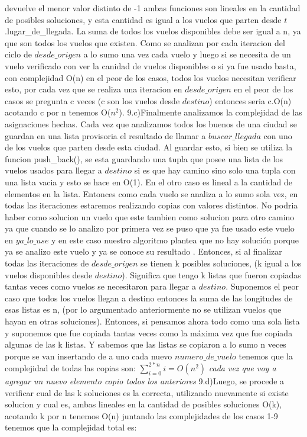 \documentclass[a4paper]{article}
\begin{document}
devuelve el menor valor distinto de -1 ambas funciones son lineales en la cantidad de posibles soluciones, y esta cantidad es igual a los vuelos que parten desde $t$.lugar\_de\_llegada. La suma de todos los vuelos disponibles debe ser igual a n, ya que son todos los vuelos que existen. Como se analizan por cada iteracion del ciclo de $desde\_origen$ a lo sumo una vez cada vuelo y luego si se necesita de un vuelo verificado con ver la canidad de vuelos disponibles o si ya fue usado basta, con complejidad O(n) en el peor de los casos, todos los vuelos necesitan verificar esto, por cada vez que se realiza una iteracion en  $desde\_origen$ en el peor de los casos se pregunta c veces (c son los vuelos desde $destino$) entonces seria c.O(n) acotando c por n tenemos O($n^{2}$). \newline
9.c)Finalmente analizamos la complejidad de las asignaciones hechas. Cada vez que analizamos todos los buenos de una ciudad se guardan en una lista provisoria el resultado de llamar a $buscar\_llegada$ con uno de los vuelos que parten desde esta ciudad. Al guardar esto, si bien se utiliza la funcion push\_back(), se esta guardando una tupla que posee una lista de los vuelos usados para llegar a $destino$ si es que hay camino sino solo una tupla con una lista vacia y esto se hace en O(1). En el otro caso es lineal a la cantidad de elementos en la lista. Entonces como cada vuelo se analiza a lo sumo sola vez, en todas las iteraciones estaremos realizando copias con valores distintos. No podria haber como solucion un vuelo que este tambien como solucion para otro camino ya que cuando se lo analizo por primera vez se puso que ya fue usado este vuelo en $ya\_lo\_use$ y en este caso nuestro algoritmo plantea que no hay solución porque ya se analizo este vuelo y ya se conoce su resultado . Entonces, si al finalizar todas las iteraciones de $desde\_origen$ se tienen k posibles soluciones, (k igual a los vuelos disponibles desde $destino$). Significa que tengo k listas que fueron copiadas tantas veces como vuelos se necesitaron para llegar a $destino$. Suponemos el peor caso que todos los vuelos llegan a destino entonces la suma de las longitudes de esas listas es n, (por lo argumentado anteriormente no se utilizan vuelos que hayan en otras soluciones). Entonces, si pensamos ahora todo como una sola lista y suponemos que fue copiada tantas veces como la máxima vez que fue copiada algunas de las k listas. Y sabemos que las listas se copiaron a lo sumo n veces porque se van insertando de a uno cada nuevo $numero\_de\_vuelo$ 
tenemos que la complejidad de todas las copias son:\newline
$\sum_{i=0}^{2*n}{i}= O(n^{2})$\newline
\textit{cada vez que voy a agregar un nuevo elemento copio todos los anteriores}\newline
9.d)Luego, se procede a verificar cual de las k soluciones es la correcta, utilizando nuevamente si existe solucion y cual es, ambas lineales en la cantidad de posibles soluciones O(k), acotando k por n tenemos O(n)\newline
juntando las complejidades de los casos 1-9 tenemos que la complejidad total es:     
\end{document}
